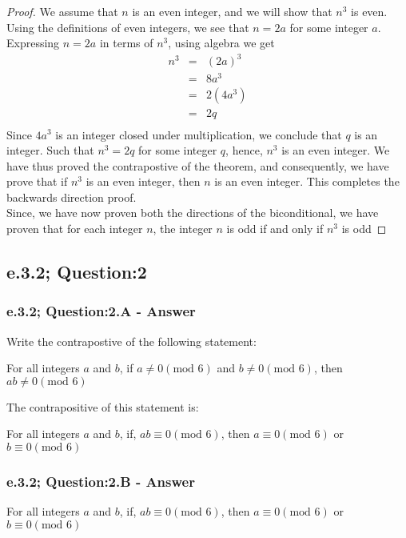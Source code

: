 \begin{proof}
We assume that $n$ is an even integer, and we will show that $n^3$ is even. Using the definitions of even integers, we see that $n = 2a$ for some integer $a$. Expressing $n = 2a$ in terms of $n^3$, using algebra we get
	\begin{eqnarray*}	
		n^3 & = & (2a)^3  \nonumber \\
		& = & 8a^3  \nonumber \\
		& = & 2(4a^3)  \nonumber \\
		& = & 2q \nonumber \\
	\end{eqnarray*}
Since $4a^3$ is an integer closed under multiplication, we conclude that $q$ is an integer. Such that $n^3 = 2q$ for some integer $q$, hence, $n^3$ is an even integer. We have thus proved the contrapostive of the theorem, and consequently, we have prove that if $n^3$ is an even integer, then $n$ is an even integer. This completes the backwards direction  proof. \\
Since, we have now proven both the directions of the biconditional, we have proven that for each integer $n$, the integer $n$ is odd if and only if $n^3$ is odd
\end{proof}



\newpage
\subsection{e.3.2; Question:2}
\subsubsection*{e.3.2; Question:2.A - Answer}
Write the contrapostive of the following statement:
	\begin{center}
		For all integers $a$ and $b$, if $a \neq 0 (\text{mod 6})$ and  $b \neq 0 (\text{mod 6})$, then $ab \neq 0 (\text{mod 6})$
	\end{center}

The contrapositive of this statement is: 
	\begin{center}
		For all integers $a$ and $b$, if, $ab \equiv 0 (\text{mod 6})$, then $a \equiv 0 (\text{mod 6})$ or  $b \equiv 0 (\text{mod 6})$
	\end{center}


\subsubsection*{e.3.2; Question:2.B - Answer}
For all integers $a$ and $b$, if, $ab \equiv 0 (\text{mod 6})$, then $a \equiv 0 (\text{mod 6})$ or  $b \equiv 0 (\text{mod 6})$

